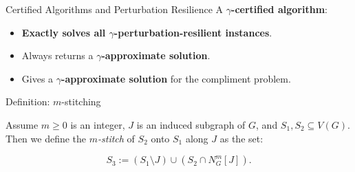 \documentclass{beamer}
\begin{document}
\begin{frame}{Certified Algorithms and Perturbation Resilience}
    A \textbf{$\gamma$-certified algorithm}:
    \begin{itemize}
        \item \textbf{Exactly solves all $\gamma$-perturbation-resilient instances}.
        \item Always returns a \textbf{$\gamma$-approximate solution}.
        \item Gives a \textbf{$\gamma$-approximate solution} for the compliment problem.
    \end{itemize}
\end{frame}


\begin{frame}{Definition: $m$-stitching}
    \begin{definition}[$m$-stitching]
        \label{m-stitch}
        Assume $m \geq 0$ is an integer, $J$ is an induced subgraph of $G$, and 
        $S_1, S_2 \subseteq V(G)$. Then we define the \textit{$m$-stitch} of $S_2$ onto $S_1$ along 
        $J$ as the set:

        \[
        S_3 := (S_1 \setminus J) \cup (S_2 \cap N^{m}_{G}[J]).
        \]
    \end{definition}
\end{frame}
\end{document}
